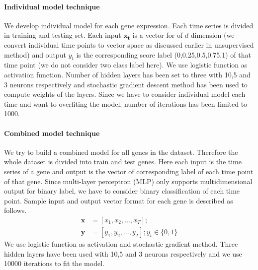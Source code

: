 \paragraph*{\textbf{Individual model technique}}
We develop individual model for each gene expression. Each time series is divided in training and testing set. Each input $\bm{x_t}$ is a vector for of $d$ dimension (we convert individual time points to vector space as discussed earlier in unsupervised method) and output $y_t$ is the corresponding score label (0,0.25,0.5,0.75,1) of that time point (we do not consider two class label here). We use logistic function as activation function. Number of hidden layers has been set to three with 10,5 and 3 neurons respectively and stochastic gradient descent method has been used to compute weights of the layers. Since we have to consider individual model each time and want to overfiting the model, number of iterations has been limited to 1000.

\paragraph*{\textbf{Combined model technique}} 
We try to build a combined model for all genes in the dataset. Therefore the whole dataset is divided into train and test genes. Here each input is the time series of a gene and output is the vector of corresponding label of each time point of that gene. Since multi-layer perceptron (MLP) only supports multidimensional output for binary label, we have to consider binary classification of each time point. Sample input and output vector format for each gene is described as follows.
\begin{align*}
    \bm{x} &=  [x_1,x_2,\dots, x_T];  \\
    \bm{y} &= [y_1,y_2,\dots, y_T] ;  y_t \in \{0,1\}
\end{align*}
We use logistic function as activation and stochastic gradient method. Three hidden layers have been used with 10,5 and 3 neurons respectively and we use 10000 iterations to fit the model.
